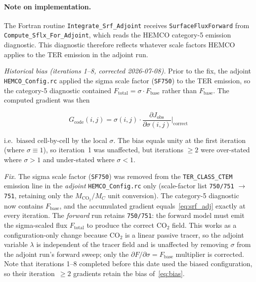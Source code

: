 \documentclass[12pt]{article}
\begin{document}
\paragraph{Note on implementation.}
The Fortran routine \texttt{Integrate\_Srf\_Adjoint} receives
\texttt{SurfaceFluxForward} from \texttt{Compute\_Sflx\_For\_Adjoint}, which reads
the HEMCO category-5 emission diagnostic. This diagnostic therefore reflects
whatever scale factors HEMCO applies to the TER emission in the adjoint run.

\emph{Historical bias (iterations 1--8, corrected 2026-07-08).} Prior to the fix,
the adjoint \texttt{HEMCO\_Config.rc} applied the sigma scale factor (\texttt{SF750})
to the TER emission, so the category-5 diagnostic contained
$F_{\mathrm{total}} = \sigma \cdot F_{\mathrm{base}}$ rather than $F_{\mathrm{base}}$.
The computed gradient was then

\begin{equation}
  G_{\mathrm{code}}(i,j)
  = \sigma(i,j) \cdot \frac{\partial J_{\mathrm{obs}}}{\partial \sigma(i,j)}\Bigg|_{\mathrm{correct}}
  \label{eq:bias}
\end{equation}

i.e.\ biased cell-by-cell by the local $\sigma$. The bias equals unity at the first
iteration (where $\sigma \equiv 1$), so iteration~1 was unaffected, but iterations
$\ge 2$ were over-stated where $\sigma > 1$ and under-stated where $\sigma < 1$.

\emph{Fix.} The sigma scale factor (\texttt{SF750}) was removed from the
\texttt{TER\_CLASS\_CTEM} emission line in the \emph{adjoint} \texttt{HEMCO\_Config.rc}
only (scale-factor list \texttt{750/751} $\to$ \texttt{751}, retaining only the
$M_{\mathrm{CO}_2}/M_C$ unit conversion). The category-5 diagnostic now contains
$F_{\mathrm{base}}$, and the accumulated gradient equals~\eqref{eq:srf_adj} exactly
at every iteration. The \emph{forward} run retains \texttt{750/751}: the forward
model must emit the sigma-scaled flux $F_{\mathrm{total}}$ to produce the correct
CO$_2$ field. This works as a configuration-only change because CO$_2$ is a linear
passive tracer, so the adjoint variable $\lambda$ is independent of the tracer
field and is unaffected by removing $\sigma$ from the adjoint run's forward sweep;
only the $\partial F/\partial\sigma = F_{\mathrm{base}}$ multiplier is corrected.
Note that iterations 1--8 completed before this date used the biased configuration,
so their iteration~$\ge 2$ gradients retain the bias of~\eqref{eq:bias}.
\end{document}
